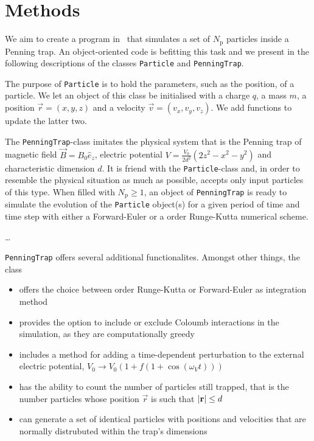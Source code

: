 \section{Methods}\label{sec:methods}


We aim to create a program in \CC\, that simulates a set of $N_\mathrm{p}$ particles inside a Penning trap. An object-oriented code is befitting this task and we present in the following descriptions of the classes \verb|Particle| and \verb|PenningTrap|.

The purpose of \texttt{Particle} is to hold the parameters, such as the position, of a particle. We let an object of this class be initialised with a charge $q$, a mass $m$, a position $\vec{r} = (x,y,z)$ and a velocity $\vec{v} = (v_x, v_y, v_z)$. We add functions to update the latter two. 

The \texttt{PenningTrap}-class imitates the physical system that is the Penning trap of magnetic field $\vec{B}=B_0\hat{e}_z$, electric potential $V = \frac{V_0}{2d^2} (2z^2-x^2-y^2)$ and characteristic dimension $d$. It is friend with the \texttt{Particle}-class and, in order to resemble the physical situation as much as possible, accepts only input particles of this type. When filled with $N_\mathrm{p}\geq 1$, an object of \texttt{PenningTrap} is ready to simulate the evolution of the \texttt{Particle} object(s) for a given period of time and time step with either a Forward-Euler or a  order Runge-Kutta numerical scheme. 

\dots


\verb|PenningTrap| offers several additional functionalites. Amongst other things, the class

\begin{itemize}
    \item offers the choice between  order Runge-Kutta or Forward-Euler as integration method %
    \item provides the option to include or exclude Coloumb interactions in the simulation, as they are computationally greedy
    \item includes a method for adding a time-dependent perturbation to the external electric potential, $V_0\rightarrow V_0 (1+ f(1+\cos{(\omega_V t)}))$
    \item has the ability to count the number of particles still trapped, that is the number particles whose position $\vec{r}$ is such that $\abs{\mathbf{r}} \leq d$
    \item can generate a set of identical particles with positions and velocities that are normally distrubuted within the trap's dimensions
\end{itemize}



